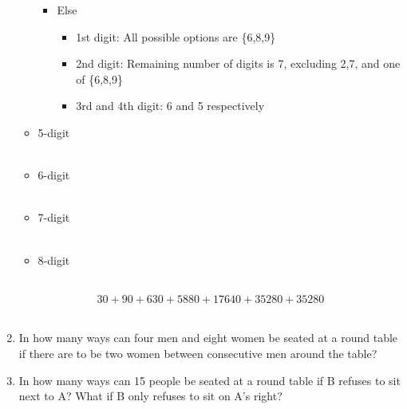 \documentclass[12pt]{article}
\begin{document}
\begin{enumerate}
\begin{itemize}
\begin{itemize}
            \item Else
            \begin{itemize}
                \item 1st digit: All possible options are \{6,8,9\}
                \item 2nd digit: Remaining number of digits is 7, excluding 2,7, and one of \{6,8,9\}
                \item 3rd and 4th digit: 6 and 5 respectively\\
            \end{itemize}
        \end{itemize}
        
        \item 5-digit\\
        \\
        
        \item 6-digit\\
        \\
        
        \item 7-digit\\
        \\
        
        \item 8-digit\\
        \\
    \end{itemize}
    $$30+90+630+5880+17640+35280+35280$$
    \\
    
    \item In how many ways can four men and eight women be seated at a round table if there are to be two women between consecutive men around the table?\\
    
    
    \item In how many ways can 15 people be seated at a round table if B refuses to sit next to A? What if B only refuses to sit on A's right?
    

\end{enumerate}
\end{document}
